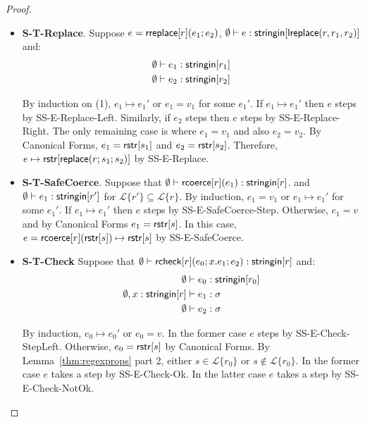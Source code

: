 \documentclass[11pt,leqno]{article}
\theoremstyle{definition}
\newcommand{\Lagr}{\mathcal{L}}
\newcommand{\lang}[1]{\Lagr\{#1\}}
\newcommand{\rcoerce}[2]{{\sf rcoerce}[#1](#2)}
\newcommand{\sistr}[1]{{\sf rstr}[#1]}   \newcommand{\rstr}[1]{{\sf rstr}[#1]} %
\newcommand{\rcheck}[4]{ {\sf rcheck}[#1](#2;#3;#4) }
\newcommand{\strin}[1]{\sistr{#1}}
\newcommand{\stringin}[1]{{\sf stringin}[#1]}
\newcommand{\lsubst}[3]{{\sf replace}(#1;#2;#3)} %
\newcommand{\lreplace}[3]{{\sf lreplace}(#1; #2; #3)}
\renewcommand{\lreplace}[3]{{\sf lreplace}(#1, #2, #3)}
\begin{document}
\begin{proof}
\begin{itemize}[label=$ $,itemsep=1ex]
\item \textbf{S-T-Replace}.
Suppose $e = {\sf rreplace}[r](e_1;e_2)$, $\emptyset\vdash e : \stringin{\lreplace{r}{r_1}{r_2}}$ and:
\begin{align}
&\emptyset\vdash e_1 : \stringin{r_1} \\
&\emptyset\vdash e_2 : \stringin{r_2}
\end{align}

By induction on (1), $e_1 \mapsto e_1'$ or $e_1 = v_1$  for some $e_1'$.
If $e_1 \mapsto e_1'$ then $e$ steps by SS-E-Replace-Left.
Similarly, if $e_2$ steps then $e$ steps by SS-E-Replace-Right.
The only remaining case is where $e_1 = v_1$ and also $e_2 = v_2$.
By Canonical Forms, $e_1 = \strin{s_1}$ and $e_2 = \strin{s_2}$.
Therefore, $e \mapsto \rstr{\lsubst{r}{s_1}{s_2}}$ by SS-E-Replace.

\item \textbf{S-T-SafeCoerce}.
Suppose that $\emptyset\vdash \rcoerce{r}{e_1} : \stringin{r}$.
and
$\emptyset\vdash e_1 : \stringin{r'}$ for $\lang{r'} \subseteq \lang{r}$. %
By induction, $e_1 =v_1$ or $e_1 \mapsto e_1'$ for some $e_1'$.
If $e_1 \mapsto e_1'$ then $e$ steps by SS-E-SafeCoerce-Step.
Otherwise, $e_1 =v$ and by Canonical Forms $e_1 = \rstr{s}$.
In this case, $e = \rcoerce{r}{\rstr{s}} \mapsto \rstr{s}$ by SS-E-SafeCoerce.

\item \textbf{S-T-Check}
Suppose that $\emptyset\vdash \rcheck{r}{e_0}{x.e_1}{e_2} : \stringin{r}$ and:
\begin{align}
\emptyset &\vdash e_0 : \stringin{r_0}  \\
\emptyset, x:\stringin{r} &\vdash e_1 : \sigma \\
\emptyset &\vdash e_2 : \sigma \label{align6}
\end{align}

By induction,  $e_0 \mapsto e_0'$ or $e_0 = v$.
In the former case $e$ steps by SS-E-Check-StepLeft.
Otherwise, $e_0 = \rstr{s}$ by Canonical Forms.
By Lemma~\ref{thm:regexprops} part 2, either $s \in \lang{r_0}$ or $s \not\in\lang{r_0}$.
In the former case $e$ takes a step by SS-E-Check-Ok.
In the latter case $e$ takes a step by SS-E-Check-NotOk.

\end{itemize}

\end{proof}
\end{document}
